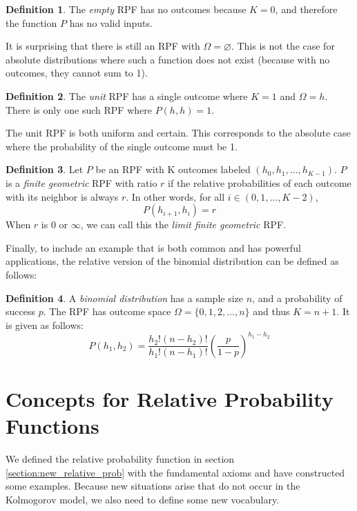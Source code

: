 \documentclass[twoside]{article}
\theoremstyle{plain}%
\theoremstyle{definition}
\newtheorem{definition}{Definition}[section]
\theoremstyle{remark}
\begin{document}
\begin{definition}
\label{def:empty_rpf}
The \textit{empty} RPF has no outcomes because \(K = 0\), and therefore the function \(P\) has no valid inputs.
\end{definition}

It is surprising that there is still an RPF with \(\Omega = \varnothing\). This is not the case for absolute distributions where such a function does not exist (because with no outcomes, they cannot sum to 1).

\begin{definition}
\label{def:unit_rpf}
The \textit{unit} RPF has a single outcome where \(K = 1\) and \(\Omega = h\). There is only one such RPF where \(P(h, h) = 1\).
\end{definition}

The unit RPF is both uniform and certain. This corresponds to the absolute case where the probability of the single outcome must be 1.

\begin{definition}
\label{def:finite_geometric_rpf}
Let \(P\) be an RPF with K outcomes labeled \((h_0, h_1, ..., h_{K-1})\). \(P\) is a \textit{finite geometric} RPF with ratio \(r\) if the relative probabilities of each outcome with its neighbor is always \(r\). In other words, for all \(i \in (0, 1, ..., K-2)\),
\[P(h_{i+1}, h_i) = r\]
When \(r\) is 0 or \(\infty\), we can call this the \textit{limit finite geometric} RPF.
\end{definition}

Finally, to include an example that is both common and has powerful applications, the relative version of the binomial distribution can be defined as follows:

\begin{definition}
\label{def:binomial_rpf}
A \textit{binomial distribution} has a sample size \(n\), and a probability of success \(p\). The RPF has outcome space \(\Omega = \{0, 1, 2, ..., n\}\) and thus \(K = n + 1\). It is given as follows:
\[P(h_1, h_2) = \frac{h_2!(n-h_2)!}{h_1!(n-h_1)!}\left(\frac{p}{1-p}\right)^{h_1 - h_2}\]
\end{definition}

\section{Concepts for Relative Probability Functions}

We defined the relative probability function in section \ref{section:new_relative_prob} with the fundamental axioms and have constructed some examples. Because new situations arise that do not occur in the Kolmogorov model, we also need to define some new vocabulary.
\end{document}
